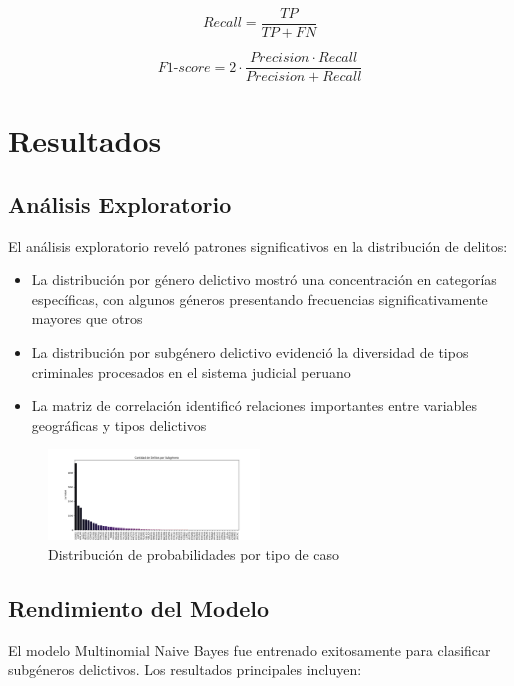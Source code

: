 \documentclass[conference]{IEEEtran}
\begin{document}
\begin{equation}
Recall = \frac{TP}{TP + FN}
\end{equation}

\begin{equation}
F1\text{-}score = 2 \cdot \frac{Precision \cdot Recall}{Precision + Recall}
\end{equation}

\section{Resultados}

\subsection{Análisis Exploratorio}

El análisis exploratorio reveló patrones significativos en la distribución de delitos:

\begin{itemize}
\item La distribución por género delictivo mostró una concentración en categorías específicas, con algunos géneros presentando frecuencias significativamente mayores que otros
\item La distribución por subgénero delictivo evidenció la diversidad de tipos criminales procesados en el sistema judicial peruano
\item La matriz de correlación identificó relaciones importantes entre variables geográficas y tipos delictivos
\end{itemize}
\begin{figure}[htbp]
\centerline{\includegraphics[width=0.5\textwidth]{N_subgeneros.png}}
\caption{Distribución de probabilidades por tipo de caso}
\label{fig:distribucion}
\end{figure}

\subsection{Rendimiento del Modelo}

El modelo Multinomial Naive Bayes fue entrenado exitosamente para clasificar subgéneros delictivos. Los resultados principales incluyen:
\end{document}
